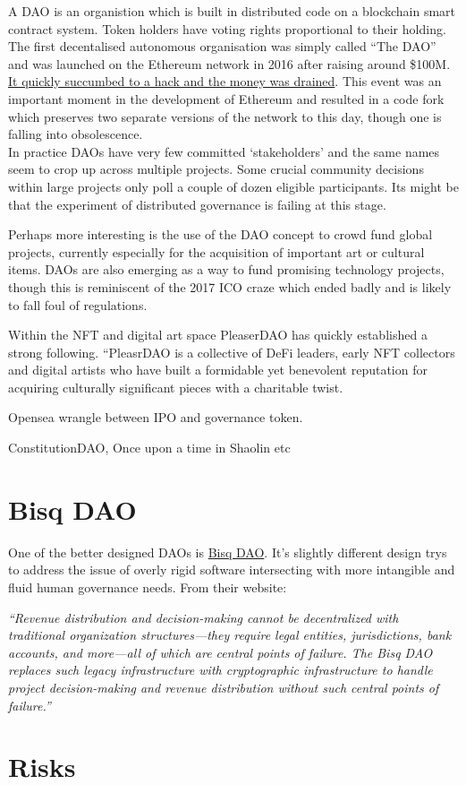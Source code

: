 A DAO is an organistion which is built in distributed code on a blockchain smart contract system. Token holders have voting rights proportional to their holding. The first decentalised autonomous organisation was simply called ``The DAO'' and was launched on the Ethereum network in 2016 after raising around \$100M. \href{https://www.gemini.com/cryptopedia/the-dao-hack-makerdao#section-what-is-a-dao}{It quickly succumbed to a hack and the money was drained}. This event was an important moment in the development of Ethereum and resulted in a code fork which preserves two separate versions of the network to this day, though one is falling into obsolescence. \\
In practice DAOs have very few committed `stakeholders' and the same names seem to crop up across multiple projects. Some crucial community decisions within large projects only poll a couple of dozen eligible participants. Its might be that the experiment of distributed governance is failing at this stage. \par
Perhaps more interesting is the use of the DAO concept to crowd fund global projects, currently especially for the acquisition of important art or cultural items. DAOs are also emerging as a way to fund promising technology projects, though this is reminiscent of the 2017 ICO craze which ended badly and is likely to fall foul of regulations.\par
Within the NFT and digital art space  PleaserDAO has quickly established a strong following.
``PleasrDAO is a collective of DeFi leaders, early NFT collectors and digital artists who have built a formidable yet benevolent reputation for acquiring culturally significant pieces with a charitable twist.\par
Opensea wrangle between IPO and governance token.\par
ConstitutionDAO, Once upon a time in Shaolin etc 

\section{Bisq DAO}
One of the better designed DAOs is \href{https://bisq.network/dao/}{Bisq DAO}. It's slightly different design trys to address the issue of overly rigid software intersecting with more intangible and fluid human governance needs. From their website:\par
\textit{``Revenue distribution and decision-making cannot be decentralized with traditional organization structures—they require legal entities, jurisdictions, bank accounts, and more—all of which are central points of failure.
The Bisq DAO replaces such legacy infrastructure with cryptographic infrastructure to handle project decision-making and revenue distribution without such central points of failure.''}

\section{Risks}
